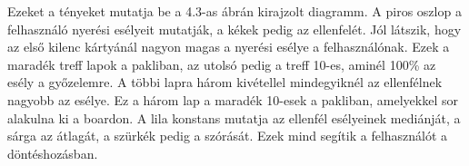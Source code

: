 Ezeket a tényeket mutatja be a 4.3-as ábrán kirajzolt diagramm. A piros oszlop a felhasználó nyerési esélyeit mutatják, a kékek pedig az ellenfelét. Jól látszik, hogy az első kilenc kártyánál nagyon magas a nyerési esélye a felhasználónak. Ezek a maradék treff lapok a pakliban, az utolsó pedig a treff 10-es, aminél 100\% az esély a győzelemre. A többi lapra három kivétellel mindegyiknél az ellenfélnek nagyobb az esélye. Ez a három lap a maradék 10-esek a pakliban, amelyekkel sor alakulna ki a boardon. A lila konstans mutatja az ellenfél esélyeinek mediánját, a sárga az átlagát, a szürkék pedig a szórását. Ezek mind segítik a felhasználót a döntéshozásban.